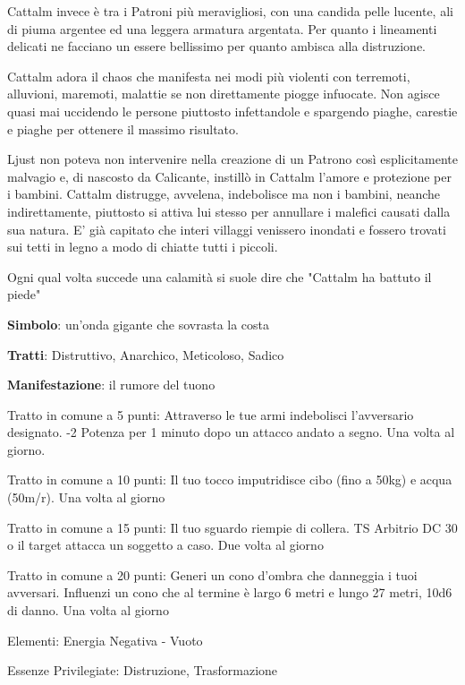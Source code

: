 \documentclass[a4paper,11pt,twoside,openany]{book}
\begin{document}
Cattalm invece è tra i Patroni più meravigliosi, con una candida pelle lucente, ali di piuma argentee ed una leggera armatura argentata. Per quanto i lineamenti delicati ne facciano un essere bellissimo per quanto ambisca alla distruzione.

Cattalm adora il chaos che manifesta nei modi più violenti con terremoti, alluvioni, maremoti, malattie se non direttamente piogge infuocate. Non agisce quasi mai uccidendo le persone piuttosto infettandole e spargendo piaghe, carestie e piaghe per ottenere il massimo risultato.

Ljust non poteva non intervenire nella creazione di un Patrono così esplicitamente malvagio e, di nascosto da Calicante, instillò in Cattalm l'amore e protezione per i bambini. Cattalm distrugge, avvelena, indebolisce ma non i bambini, neanche indirettamente, piuttosto si attiva lui stesso per annullare i malefici causati dalla sua natura.
E' già capitato che interi villaggi venissero inondati e fossero trovati sui tetti in legno a modo di chiatte tutti i piccoli.

Ogni qual volta succede una calamità si suole dire che "Cattalm ha battuto il piede"

\textbf{Simbolo}: un'onda gigante che sovrasta la costa

\textbf{Tratti}: Distruttivo, Anarchico, Meticoloso, Sadico

\textbf{Manifestazione}: il rumore del tuono

\bigskip

Tratto in comune a 5 punti: Attraverso le tue armi indebolisci l'avversario designato. -2 Potenza per 1 minuto dopo un attacco andato a segno. Una volta al giorno.

Tratto in comune a 10 punti: Il tuo tocco imputridisce cibo (fino a 50kg) e acqua (50m/r). Una volta al giorno

Tratto in comune a 15 punti: Il tuo sguardo riempie di collera. TS Arbitrio DC 30 o il target attacca un soggetto a caso. Due volta al giorno

Tratto in comune a 20 punti: Generi un cono d'ombra che danneggia i tuoi avversari. Influenzi un cono che al termine è largo 6 metri e lungo 27 metri, 10d6 di danno. Una volta al giorno

\bigskip

Elementi: Energia Negativa - Vuoto

\bigskip

Essenze Privilegiate: Distruzione, Trasformazione
\end{document}
